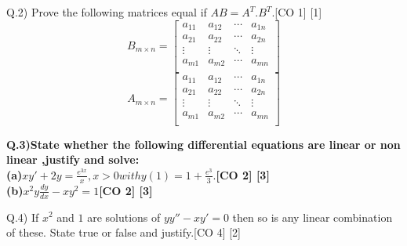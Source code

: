 \documentclass[12pt]{article}
\begin{document}
	
	
	
	\begin{flushleft}
		
		Q.2) Prove the following matrices equal if $AB = A^T.B^T$.\hspace{1cm}[CO 1] [1]\\ 
		\[
		B_{m\times n} =
		\left[ {\begin{array}{cccc}
				a_{11} & a_{12} & \cdots & a_{1n}\\
				a_{21} & a_{22} & \cdots & a_{2n}\\
				\vdots & \vdots & \ddots & \vdots\\
				a_{m1} & a_{m2} & \cdots & a_{mn}\\
		\end{array} } \right]
		\]\[
		A_{m\times n} =
		\left[ {\begin{array}{cccc}
				a_{11} & a_{12} & \cdots & a_{1n}\\
				a_{21} & a_{22} & \cdots & a_{2n}\\
				\vdots & \vdots & \ddots & \vdots\\
				a_{m1} & a_{m2} & \cdots & a_{mn}\\
		\end{array} } \right]
		\]
	\end{flushleft}
	
	\begin{flushleft}
		\bfseries
		Q.3)State whether the following differential equations are linear or non linear ,justify and solve:\\[10pt]
		\normalfont
		\hspace{1cm}(a)$xy'+2y = \frac{e^{3x}}{x}, x>0 with y(1)=1+\frac{e^3}{3}. $\hspace{2.5cm}[CO 2] [3]\\[6 pt]
		\hspace{1cm}(b)$x^2y\frac{dy}{dx}- xy^2 = 1$\hspace{6.5cm}[CO 2] [3]
	\end{flushleft}
	
	\begin{flushleft}
		Q.4) If $x^2$ and $1$ are solutions of $yy''-xy'=0$ then so is any linear combination of these. State true or false and justify.\hspace{2cm}[CO 4] [2]
	\end{flushleft}
	
\end{document}
